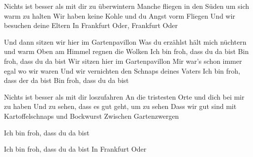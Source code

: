 \begin{verse*}
Nichts ist besser als mit dir zu überwintern
Manche fliegen in den Süden um sich warm zu halten
Wir haben keine Kohle und du Angst vorm Fliegen
Und wir besuchen deine Eltern
In Frankfurt Oder, Frankfurt Oder
\end{verse*}

\begin{chorus}
Und dann sitzen wir hier im Gartenpavillon
Was du erzählst hält mich nüchtern und warm
Oben am Himmel regnen die Wolken
Ich bin froh, dass du da bist
Bin froh, dass du da bist
Wir sitzen hier im Gartenpavillon
Mir war's schon immer egal wo wir waren
Und wir vernichten den Schnaps deines Vaters
Ich bin froh, dass der da bist
Bin froh, dass du da bist
\end{chorus}

\begin{verse*}
Nichts ist besser als mit dir loszufahren
An die tristesten Orte und dich bei mir zu haben
Und zu sehen, dass es gut geht, um zu sehen
Dass wir gut sind mit Kartoffelschnaps und Bockwurst
Zwischen Gartenzwergen
\end{verse*}

\thechorus

\begin{verse*}
Ich bin froh, dass du da bist 
\end{verse*}

\thechorus

\begin{verse*}
Ich bin froh, dass du da bist 
In Frankfurt Oder
\end{verse*}
